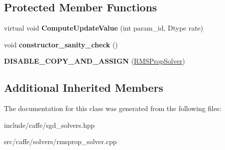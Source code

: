 \subsection*{Protected Member Functions}
\begin{DoxyCompactItemize}
\item 
virtual void {\bfseries Compute\+Update\+Value} (int param\+\_\+id, Dtype rate)\hypertarget{classcaffe_1_1RMSPropSolver_a685e363f18013c1876cea226a006a668}{}\label{classcaffe_1_1RMSPropSolver_a685e363f18013c1876cea226a006a668}

\item 
void {\bfseries constructor\+\_\+sanity\+\_\+check} ()\hypertarget{classcaffe_1_1RMSPropSolver_af2ca9ae2da34564fa9f3cc6ab54ae78e}{}\label{classcaffe_1_1RMSPropSolver_af2ca9ae2da34564fa9f3cc6ab54ae78e}

\item 
{\bfseries D\+I\+S\+A\+B\+L\+E\+\_\+\+C\+O\+P\+Y\+\_\+\+A\+N\+D\+\_\+\+A\+S\+S\+I\+GN} (\hyperlink{classcaffe_1_1RMSPropSolver}{R\+M\+S\+Prop\+Solver})\hypertarget{classcaffe_1_1RMSPropSolver_ac262d365eb1113fcad19128205df18e8}{}\label{classcaffe_1_1RMSPropSolver_ac262d365eb1113fcad19128205df18e8}

\end{DoxyCompactItemize}
\subsection*{Additional Inherited Members}


The documentation for this class was generated from the following files\+:\begin{DoxyCompactItemize}
\item 
include/caffe/sgd\+\_\+solvers.\+hpp\item 
src/caffe/solvers/rmsprop\+\_\+solver.\+cpp\end{DoxyCompactItemize}
